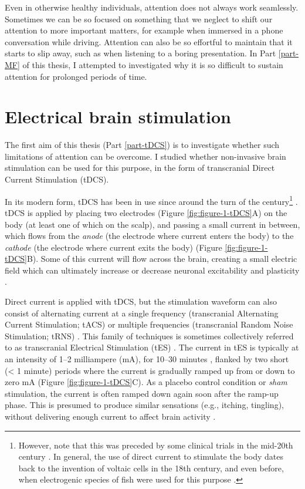 \documentclass[11pt,english,]{memoir}
\let\rmarkdownfootnote\footnote%
\def\footnote{\protect\rmarkdownfootnote}
\begin{document}
Even in otherwise healthy individuals, attention does not always work seamlessly. Sometimes we can be so focused on something that we neglect to shift our attention to more important matters, for example when immersed in a phone conversation while driving. Attention can also be so effortful to maintain that it starts to slip away, such as when listening to a boring presentation. In Part \ref{part-MF} of this thesis, I attempted to investigated why it is so difficult to sustain attention for prolonged periods of time.

\hypertarget{electrical-brain-stimulation}{%
\section{Electrical brain stimulation}\label{electrical-brain-stimulation}}

The first aim of this thesis (Part \ref{part-tDCS}) is to investigate whether such limitations of attention can be overcome. I studied whether non-invasive brain stimulation can be used for this purpose, in the form of transcranial Direct Current Stimulation (tDCS).

In its modern form, tDCS has been in use since around the turn of the century\footnote{However, note that this was preceded by some clinical trials in the mid-20th century \autocite[e.g.,][]{Redfearn1964}. In general, the use of direct current to stimulate the body dates back to the invention of voltaic cells in the 18th century, and even before, when electrogenic species of fish were used for this purpose \autocites{Guleyupoglu2013}{Priori2003}{Sarmiento2016}.} \autocites{Priori1998}{Nitsche2000}. tDCS is applied by placing two electrodes (Figure \ref{fig:figure-1-tDCS}A) on the body (at least one of which on the scalp), and passing a small current in between, which flows from the \emph{anode} (the electrode where current enters the body) to the \emph{cathode} (the electrode where current exits the body) \autocite{Gebodh2019a} (Figure \ref{fig:figure-1-tDCS}B). Some of this current will flow across the brain, creating a small electric field which can ultimately increase or decrease neuronal excitability and plasticity \autocite{Reato2019}.

Direct current is applied with tDCS, but the stimulation waveform can also consist of alternating current at a single frequency (transcranial Alternating Current Stimulation; tACS) or multiple frequencies (transcranial Random Noise Stimulation; tRNS) \autocite{Fertonani2017}. This family of techniques is sometimes collectively referred to as transcranial Electrical Stimulation (tES) \autocite{Gebodh2019a}. The current in tES is typically at an intensity of 1--2 milliampere (mA), for 10--30 minutes \autocite{Bikson2016}, flanked by two short (\textless{} 1 minute) periods where the current is gradually ramped up from or down to zero mA (Figure \ref{fig:figure-1-tDCS}C). As a placebo control condition or \emph{sham} stimulation, the current is often ramped down again soon after the ramp-up phase. This is presumed to produce similar sensations (e.g., itching, tingling), without delivering enough current to affect brain activity \autocite{Fonteneau2019}.
\end{document}
